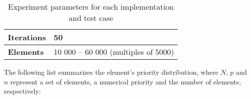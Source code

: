 \documentclass[a4paper,11pt]{kth-mag}
\newcommand*{\skippara}{\par\vspace{\baselineskip} \noindent}
\begin{document}
\begin{table}
    \small
    \caption{Experiment parameters for each implementation and test case}
    \label{tab:param}
    \begin{adjustbox}{center}
        \renewcommand*\arraystretch{1.2}\begin{tabular}{| L{3.5cm} || L{5.5cm} |}
            \hline
            \textbf{Iterations} & 50
            \\ \hline
            \textbf{Elements} & 10 000 -- 60 000 (multiples of 5000)
            \\ \hline
        \end{tabular}
    \end{adjustbox}
\end{table}


\skippara The following list summarizes the element's priority distribution, where $N$, $p$ and $n$ represent a set of elements, a numerical priority and the number of elements, respectively:
\clearpage
\end{document}
